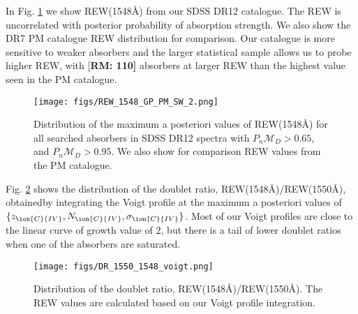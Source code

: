 \documentclass[fleqn,usenatbib]{mnras}
\newcommand{\civ}{\ion{C}{IV}}
\newcommand{\nciv}{N_{\civ}} %
\newcommand{\zciv}{z_{\civ}}
\newcommand{\sciv}{\sigma_{\civ}}
\newcommand{\model}{\mathcal{M}}
\newcommand{\rmon}[1]{\textcolor{rez}{[\bf RM: #1]}}
\begin{document}
    In Fig. \ref{fig:DR12-DR7-REW} we show REW(1548\AA) from our 
    SDSS DR12 catalogue. The REW is uncorrelated with posterior 
    probability of absorption strength. We also show the DR7 PM 
    catalogue REW distribution for comparison. Our catalogue 
    is more sensitive to weaker absorbers and the larger statistical sample allows us to probe higher REW, with \rmon{110} 
    absorbers at larger REW than the highest value seen in the PM catalogue.

    \begin{figure}
      \texttt{[image: figs/REW\_1548\_GP\_PM\_SW\_2.png]}
      \caption{Distribution of the maximum a posteriori values
      of REW(1548\AA) for all searched absorbers
      in SDSS DR12 spectra with  $P_n{\model_D}>0.65$, 
       and $P_n{\model_D}>0.95$.
      We also show for comparison REW values from the PM catalogue.}
      \label{fig:DR12-DR7-REW}
      \end{figure}

    Fig. \ref{fig:DR} shows the distribution of the doublet ratio, REW(1548\AA)/REW(1550\AA), obtainedby integrating the Voigt profile at the maximum a posteriori values of
    $\{\zciv, \nciv, \sciv\}$. Most of our Voigt profiles are close to the
 linear curve of growth value of $2$, but there is a tail of lower doublet ratios when one of the absorbers are saturated.

  \begin{figure}

     \texttt{[image: figs/DR\_1550\_1548\_voigt.png]}
     \caption{Distribution of the doublet ratio, REW(1548\AA)/REW(1550\AA). The
     REW values are calculated based on our Voigt profile integration. }
     \label{fig:DR}
  \end{figure}



\end{document}
